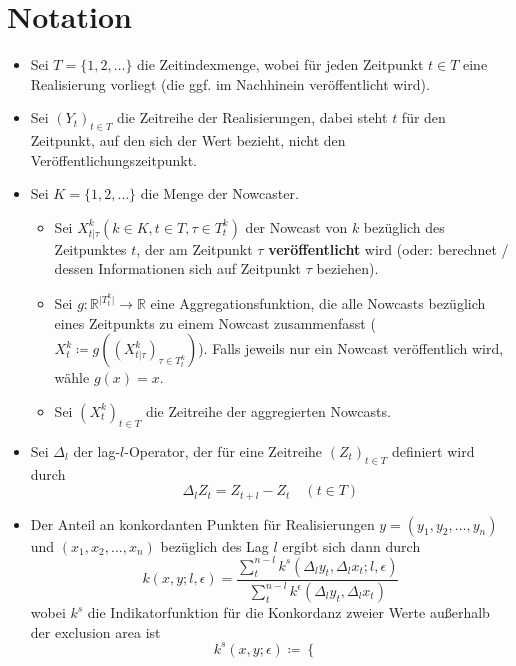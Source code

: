 \documentclass{article}
\theoremstyle{plain}%
\theoremstyle{definition}
\newcommand{\lag}[1][l]{\Delta_{#1}}
\begin{document}
\section{Notation}
\begin{itemize}
  \item Sei $T = \{1, 2, \dots\}$ die Zeitindexmenge, wobei für jeden Zeitpunkt $t \in T$ eine Realisierung vorliegt (die ggf. im Nachhinein veröffentlicht wird).
  \item Sei $(Y_t)_{t \in T}$ die Zeitreihe der Realisierungen, dabei steht $t$ für den Zeitpunkt, auf den sich der Wert bezieht, nicht den Veröffentlichungszeitpunkt.
  \item Sei $K = \{1, 2, \dots\}$ die Menge der Nowcaster.
	\begin{itemize}
	  \item Sei $X_{t \lvert \tau}^k (k \in K, t \in T, \tau \in T_t^k)$ der Nowcast von $k$ bezüglich des Zeitpunktes $t$, der am Zeitpunkt $\tau$ \textbf{veröffentlicht} wird (oder: berechnet / dessen Informationen sich auf Zeitpunkt $\tau$ beziehen).
	  \item Sei $g: \mathbb{R}^{\lvert T_t^k \lvert} \rightarrow \mathbb{R}$ eine Aggregationsfunktion, die alle Nowcasts bezüglich eines Zeitpunkts zu einem Nowcast zusammenfasst ($X_t^k \coloneqq g((X_{t \lvert \tau}^k)_{\tau \in T_t^k})$). Falls jeweils nur ein Nowcast veröffentlich wird, wähle $g(x) = x$.
	  \item Sei $(X_t^k)_{t \in T}$ die Zeitreihe der aggregierten Nowcasts.
	\end{itemize}
  \item Sei $\lag[l]$ der lag-$l$-Operator, der für eine Zeitreihe $(Z_t)_{t \in T}$ definiert wird durch 
		\begin{equation}
			\lag[l]Z_t = Z_{t+l} - Z_t \quad (t \in T)
		\end{equation} 
  \item Der Anteil an konkordanten Punkten für Realisierungen $y = (y_1, y_2, \dots, y_n)$ und $(x_1, x_2, \dots, x_n)$ bezüglich des Lag $l$ ergibt sich dann durch
	\begin{equation}
  		k (x, y; l, \epsilon) = \frac{\sum_{t}^{n-l} k^s (\lag y_t, \lag x_t; l, \epsilon)}{\sum_{t}^{n-l} k^\epsilon (\lag y_t, \lag x_t)}
	\end{equation}
	wobei $k^s$ die Indikatorfunktion für die Konkordanz zweier Werte außerhalb der exclusion area ist
	\begin{equation}
  		k^s (x, y; \epsilon) \coloneqq \begin{cases}

\end{cases}
\end{equation}
\end{itemize}
\end{document}
